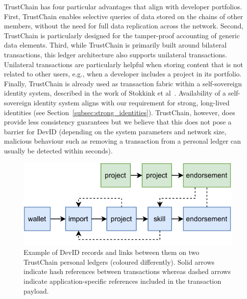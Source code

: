 TrustChain has four particular advantages that align with developer portfolios.
First, TrustChain enables selective queries of data stored on the chains of other members, without the need for full data replication across the network.
Second, TrustChain is particularly designed for the tamper-proof accounting of generic data elements.
Third, while TrustChain is primarily built around bilateral transactions, this ledger architecture also supports unilateral transactions.
Unilateral transactions are particularly helpful when storing content that is not related to other users, e.g., when a developer includes a project in its portfolio.
Finally, TrustChain is already used as transaction fabric within a self-sovereign identity system, described in the work of Stokkink et al~\cite{stokkink2018deployment}.
Availability of a self-sovereign identity system aligns with our requirement for strong, long-lived identities (see Section~\ref{subsec:strong_identities}).
TrustChain, however, does provide less consistency guarantees but we believe that this does not pose a barrier for DevID (depending on the system parameters and network size, malicious behaviour such as removing a transaction from a personal ledger can usually be detected within seconds).

\begin{figure}[t!]
	\centering
	\includegraphics[width=.8\linewidth]{devid/resources/trustchain_devid.pdf}
	\caption{Example of DevID records and links between them on two TrustChain personal ledgers (coloured differently). Solid arrows indicate hash references between transactions whereas dashed arrows indicate application-specific references included in the transaction payload.}
	\label{fig:devid_trustchain}
\end{figure}

